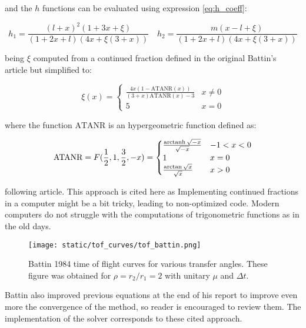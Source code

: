 and the $h$ functions can be evaluated using expression \ref{eq:h_coeff}:

\begin{equation}
	h_1 = \frac{(l+x)^2(1 + 3x + \xi)}{(1+2x+l)(4x + \xi(3+x))}\quad
	h_2 = \frac{m(x-l+\xi)}{(1+2x+l)(4x + \xi(3+x))}
	\label{eq:h_coeff}
\end{equation}

being $\xi$ computed from a continued fraction defined in the original Battin's
article but simplified to:

\begin{equation}
  \xi(x) =
  \begin{cases}
	  \frac{4x(1 - \text{ATANR}(x))}{(3 +x)\text{ATANR}(x) - 3} &
	  \text{$x\neq0$}\\
	  5 & \text{$x = 0$}
  \end{cases}
\end{equation}

where the function $\text{ATANR}$ is an hypergeometric function defined as:

\begin{equation}
  \text{ATANR} = F(\frac{1}{2}, 1, \frac{3}{2}, -x) =
  \begin{cases}
	  \frac{\operatorname{arctanh}{\sqrt{-x}}}{\sqrt{-x}} & \text{$-1 < x < 0$}\\
	  1 & \text{$x = 0$} \\
	  \frac{\arctan{\sqrt{x}}}{\sqrt{x}} & \text{$x > 0$}
  \end{cases}
\end{equation}

following \cite{allen2015} article. This approach is cited here as
Implementing continued fractions in a computer might be a bit tricky, leading to
non-optimized code. Modern computers do not struggle with the computations of
trigonometric functions as in the old days.

\vspace{0.5cm}
\begin{figure}[h]
  \centering
  \texttt{[image: static/tof\_curves/tof\_battin.png]}
  \caption{Battin 1984 time of flight curves for various transfer angles. These
  figure was obtained for $\rho=r_2/r_1=2$ with unitary $\mu$ and $\Delta t$.}
  \label{fig:tof_battin}
\end{figure}


Battin also improved previous equations at the end of his report to improve even
more the convergence of the method, so reader is encouraged to review them. The
implementation of the solver corresponds to these cited approach.

